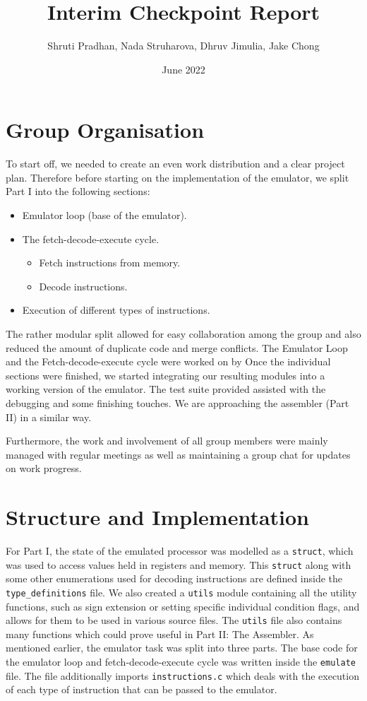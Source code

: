 \documentclass[12pt, letterpaper]{article}
\title{Interim Checkpoint Report}
\author{Shruti Pradhan, Nada Struharova, Dhruv Jimulia, Jake Chong }
\date{June 2022}
\begin{document}
\maketitle

\section{Group Organisation}
To start off, we needed to create an even work distribution and a clear project plan. Therefore before starting on the implementation of the emulator, we split Part I into the following sections:
\begin{itemize}
  \item Emulator loop (base of the emulator).
  \item The fetch-decode-execute cycle.
  \begin{itemize}
      \item Fetch instructions from memory.
      \item Decode instructions.
  \end{itemize}
  \item Execution of different types of instructions.
\end{itemize}
The rather modular split allowed for easy collaboration among the group and also reduced the amount of duplicate code and merge conflicts. The Emulator Loop and the Fetch-decode-execute cycle were worked on by Once the individual sections were finished, we started integrating our resulting modules into a working version of the emulator. The test suite provided assisted with the debugging and some finishing touches. We are approaching the assembler (Part II) in a similar way.

Furthermore, the work and involvement of all group members were mainly managed with regular meetings as well as maintaining a group chat for updates on work progress.

\section{Structure and Implementation}
For Part I, the state of the emulated processor was modelled as a \verb|struct|, which was used to access values held in registers and memory. This \verb|struct| along with some other enumerations used for decoding instructions are defined inside the \verb|type_definitions| file. We also created a \verb|utils| module containing all the utility functions, such as sign extension or setting specific individual condition flags, and allows for them to be used in various source files. The \verb|utils| file also contains many functions which could prove useful in Part II: The Assembler. As mentioned earlier, the emulator task was split into three parts. The base code for the emulator loop and fetch-decode-execute cycle was written inside the \verb|emulate| file. The file additionally imports \verb|instructions.c| which deals with the execution of each type of instruction that can be passed to the emulator.
\end{document}
